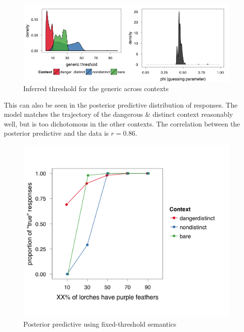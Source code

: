 \documentclass[10pt,letterpaper]{article}
\begin{document}
\begin{figure}
\centering
    \includegraphics[width=\columnwidth]{fig2_bda1_combined}
    \caption{Inferred threshold for the generic across contexts}
  \label{fig:bda1a}
\end{figure}

This can also be seen in the posterior predictive distribution of responses. The model matches the trajectory of the dangerous \& distinct context reasonably well, but is too dichotomous in the other contexts. The correlation between the posterior predictive and the data is $r = 0.86$. 

\begin{figure}
\centering
    \includegraphics[width=\columnwidth]{fig3_bda1_postpred}
    \caption{Posterior predictive using fixed-threshold semantics}
  \label{fig:bda1posteriorpred}
\end{figure}





\end{document}

